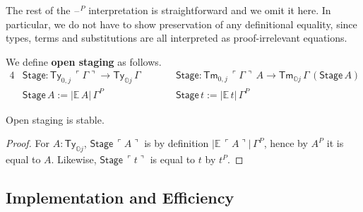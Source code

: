\documentclass[acmsmall]{acmart}
\newcommand{\msf}[1]{\mathsf{#1}}
\newcommand{\mbb}[1]{\mathbb{#1}}
\newcommand{\mbbo}{\mbb{O}}
\newcommand{\Ty}{\msf{Ty}}
\newcommand{\Tm}{\msf{Tm}}
\newcommand{\blank}{{\mathord{\hspace{1pt}\text{--}\hspace{1pt}}}}
\newcommand{\emb}[1]{\ulcorner#1\urcorner}
\newcommand{\Stage}{\msf{Stage}}
\newcommand{\ev}{\mbb{E}}
\theoremstyle{remark}
\begin{document}
The rest of the $\blank^P$ interpretation is straightforward and we omit it
here. In particular, we do not have to show preservation of any definitional
equality, since types, terms and substitutions are all interpreted as
proof-irrelevant equations.

\begin{definition} We define \textbf{open staging} as follows.
\begin{alignat*}{4}
  & \Stage : \Ty_{0,j}\,\emb{\Gamma} \to \Ty_{\mbbo j}\,\Gamma \hspace{2em} && \Stage : \Tm_{0,j}\,\emb{\Gamma}\,A \to \Tm_{\mbbo j}\,\Gamma\,(\Stage\,A) \\
  & \Stage\,A := |\ev\,A|\,\Gamma^P && \Stage\,t := |\ev\,t|\,\Gamma^P
\end{alignat*}
\end{definition}

\begin{theorem} Open staging is stable.
\end{theorem}
\begin{proof} For $A : \Ty_{\mbbo j}$, $\Stage\,\emb{A}$ is by definition $|\ev\,\emb{A}|\,\Gamma^P$,
  hence by $A^P$ it is equal to $A$. Likewise, $\Stage\,\emb{t}$ is equal to $t$ by $t^P$.
\end{proof}

\subsection{Implementation and Efficiency}
\end{document}
